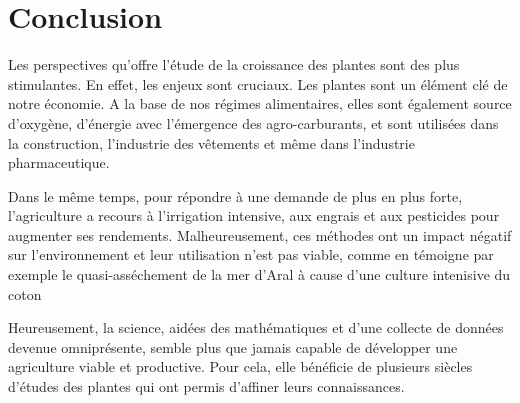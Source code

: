 \section*{Conclusion}

Les perspectives qu'offre l'étude de la croissance des plantes sont des plus stimulantes.
En effet, les enjeux sont cruciaux. Les plantes sont un élément clé de notre économie. A la base de nos régimes alimentaires, elles sont également source d'oxygène, d'énergie avec l'émergence des agro-carburants, et sont utilisées dans la construction, l'industrie des vêtements et même dans l'industrie pharmaceutique.

Dans le même temps, pour répondre à une demande de plus en plus forte, l'agriculture a recours à l'irrigation intensive, aux engrais et aux pesticides pour augmenter ses rendements. Malheureusement, ces méthodes ont un impact négatif sur l'environnement et leur utilisation n'est pas viable, comme en témoigne par exemple le quasi-asséchement de la mer d'Aral à cause d'une culture intenisive du coton~\cite{aral}
 
Heureusement, la science, aidées des mathématiques et d'une collecte de données devenue omniprésente, semble plus que jamais capable de développer une agriculture viable et productive. Pour cela, elle bénéficie de plusieurs siècles d'études des plantes qui ont permis d'affiner leurs connaissances.


